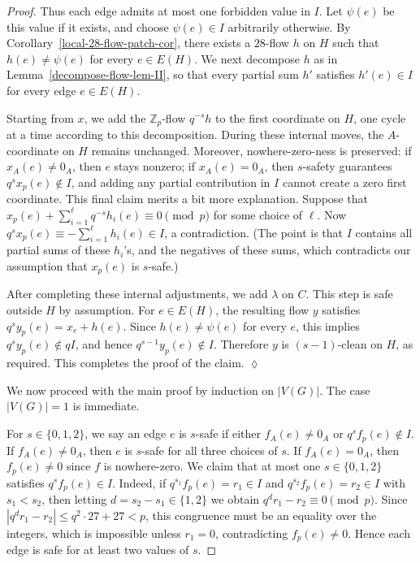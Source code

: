 \documentclass[a4paper,12pt]{article}
\theoremstyle{plain}
\theoremstyle{definition}
\renewcommand\le\leqslant
\begin{document}
\begin{proof}
Thus each edge admits at most one forbidden value in $I$. Let $\psi(e)$ be this value if it exists, and choose $\psi(e)\in I$ arbitrarily otherwise. By Corollary~\ref{local-28-flow-patch-cor}, there exists a $28$-flow $h$ on $H$ such that $h(e)\neq \psi(e)$ for every $e\in E(H)$.
%
We next decompose $h$ as in Lemma~\ref{decompose-flow-lem-II}, so that every partial sum $h'$ satisfies $h'(e)\in I$ for every edge $e\in E(H)$.

Starting from $x$, we add the $\mathbb{Z}_p$-flow $q^{-s}h$ to the first coordinate on $H$, one cycle at a time according to this decomposition. During these internal moves, the $A$-coordinate on $H$ remains unchanged. Moreover, nowhere-zero-ness is preserved: if $x_A(e)\neq 0_A$, then $e$ stays nonzero; if $x_A(e)=0_A$, then $s$-safety guarantees $q^s x_p(e)\notin I$, 
and adding any partial contribution in $I$ cannot create a zero first coordinate.  This final claim merits a bit more explanation.  Suppose that $x_p(e)+\sum_{i=1}^{\ell}q^{-s}h_i(e)\equiv0\pmod p$ for some choice of $\ell$.
Now $q^sx_p(e)\equiv-\sum_{i=1}^{\ell}h_i(e)\in I$, a contradiction.  (The point is that $I$ contains all partial sums of these $h_i$'s, and the negatives of these sums, which contradicts our assumption that $x_p(e)$ is $s$-safe.)

After completing these internal adjustments, we add $\lambda$ on $C$. This step is safe outside $H$ by assumption. For $e\in E(H)$, the resulting flow $y$ satisfies $q^s y_p(e)=x_e+h(e)$. Since $h(e)\neq \psi(e)$ for every $e$, this implies $q^s y_p(e)\notin qI$, and hence $q^{s-1}y_p(e)\notin I$. Therefore $y$ is $(s-1)$-clean on $H$, as required. This completes the proof of the claim.
\hfill $\lozenge$

\medskip

We now proceed with the main proof by induction on $|V(G)|$. The case $|V(G)|=1$ is immediate.

For $s\in\{0,1,2\}$, we say an edge $e$ is $s$-safe if either $f_A(e)\neq 0_A$ or $q^s f_p(e)\notin I$. If $f_A(e)\neq 0_A$, then $e$ is $s$-safe for all three choices of $s$. If $f_A(e)=0_A$, then $f_p(e)\neq 0$ since $f$ is nowhere-zero. We claim that at most one $s\in\{0,1,2\}$ satisfies $q^s f_p(e)\in I$. Indeed, if $q^{s_1}f_p(e)=r_1\in I$ and $q^{s_2}f_p(e)=r_2\in I$ with $s_1<s_2$, then letting $d=s_2-s_1\in\{1,2\}$ we obtain $q^d r_1-r_2\equiv 0\pmod p$. Since $|q^d r_1-r_2|\le q^2\cdot 27+27<p$, this congruence must be an equality over the integers, which is impossible unless $r_1=0$, contradicting $f_p(e)\neq 0$. Hence each edge is safe for at least two values of $s$.


\end{proof}
\end{document}

